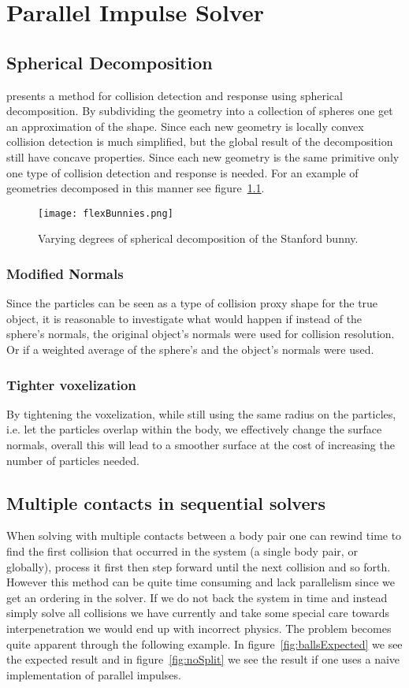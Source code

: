 \chapter{Parallel Impulse Solver}\label{cha:impl}

\section{Spherical Decomposition}
\cite{gpugems} presents a method for collision detection and response using spherical
decomposition. By subdividing the geometry into a collection of spheres one get an
approximation of the shape. Since each new geometry is locally convex collision
detection is much simplified, but the global result of the decomposition still have
concave properties. Since each new geometry is the same primitive only
one type of collision detection and response is needed. For an example of geometries
decomposed in this manner see figure~\ref{fig:bunnies}.

\begin{figure}[H]
  \centering
  \texttt{[image: flexBunnies.png]}
  \caption{Varying degrees of spherical decomposition of the Stanford bunny.}
  \label{fig:bunnies}
\end{figure}

\subsection{Modified Normals}
Since the particles can be seen as a type of collision proxy shape for the true object,
it is reasonable to investigate what would happen if instead of the sphere's normals,
the original object's normals were used for collision resolution. Or if a weighted
average of the sphere's and the object's normals were used.
\subsection{Tighter voxelization}
By tightening the voxelization, while still using the same radius on the particles,
i.e. let the particles overlap within the body, we effectively change the surface
normals, overall this will lead to a smoother surface at the cost of increasing the number
of particles needed.

\section{Multiple contacts in sequential solvers}
When solving with multiple contacts between a body pair one can rewind time to
find the first collision
that occurred in the system (a single body pair, or globally), process it first
then step forward until the next collision and so forth. However this method can
be quite time consuming and lack parallelism since we get an ordering in the solver.
If we do not back the system in time and
instead simply solve all collisions we have currently and take some special care
towards interpenetration we would end up with incorrect physics. The problem
becomes quite apparent through the following example.
In figure~\ref{fig:ballsExpected} we see the expected result and in
figure~\ref{fig:noSplit} we see the result if one uses a naive implementation of
parallel impulses.

